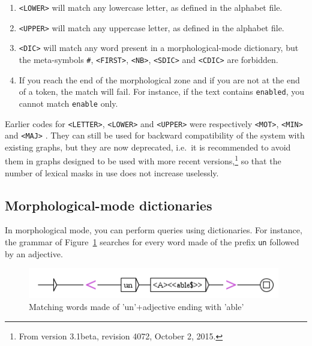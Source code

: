 \begin{enumerate}
    \item \verb+<LOWER>+ will match any lowercase letter, as defined in the
    alphabet file.

    \item \verb+<UPPER>+ will match any uppercase letter, as defined in the
    alphabet file.

    \item \verb+<DIC>+ will match any word present in a morphological-mode
    dictionary, but the meta-symbols \verb+#+, \verb+<FIRST>+, \verb+<NB>+, 
    \verb+<SDIC>+ and \verb+<CDIC>+ are forbidden.\index{\verbt{\#}}     

    \item If you reach the end of the morphological zone and if you are not
    at the end of a token, the match will fail. For instance, if the text
    contains \verb+enabled+, you cannot match \verb+enable+ only.
\end{enumerate}

\noindent Earlier codes for \verb+<LETTER>+, \verb+<LOWER>+ and \verb+<UPPER>+
were respectively \verb+<MOT>+, \verb+<MIN>+ and \verb+<MAJ>+ .
They can still be used for backward compatibility of the system with existing graphs,
but they are now deprecated, i.e.\ it is recommended to avoid them in graphs designed to be used with
more recent versions,\footnote{From version 3.1beta, revision 4072, October 2, 2015.}
so that the number of lexical masks in use does not increase uselessly.

\subsection{Morphological-mode dictionaries}
\label{morph-mode-dic}
In morphological mode, you can perform queries using dictionaries. For instance,  the grammar
of Figure~\ref{fig-morpho3} searches for every word made of the prefix \verb+un+ followed
by an adjective.

\begin{figure}[!ht]
\begin{center}
\includegraphics[width=11cm]{resources/img/fig6-17m.png}
\caption{Matching words made of 'un'+adjective ending with
'able'\label{fig-morpho3}}
\end{center}
\end{figure}

